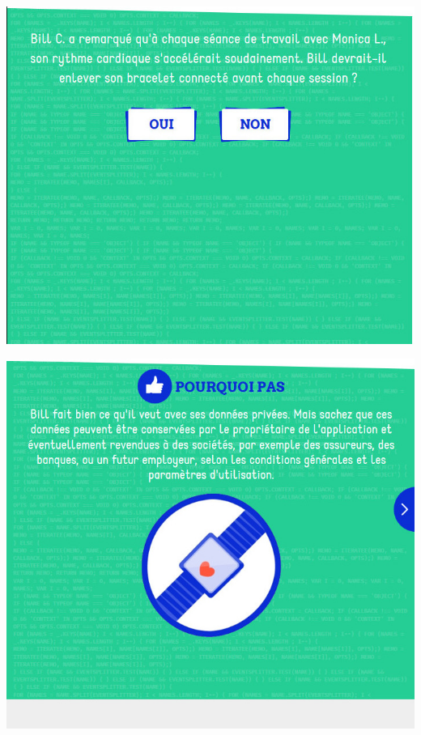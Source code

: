 \documentclass{beamer}
\begin{document}
\begin{frame}\includegraphics[scale=0.6] {./images/Quizz_HygieneNumerique_France4_8.jpg} \end{frame}
\begin{frame}\includegraphics[scale=0.6] {./images/Quizz_HygieneNumerique_France4_9.jpg} \end{frame}
\end{document}
